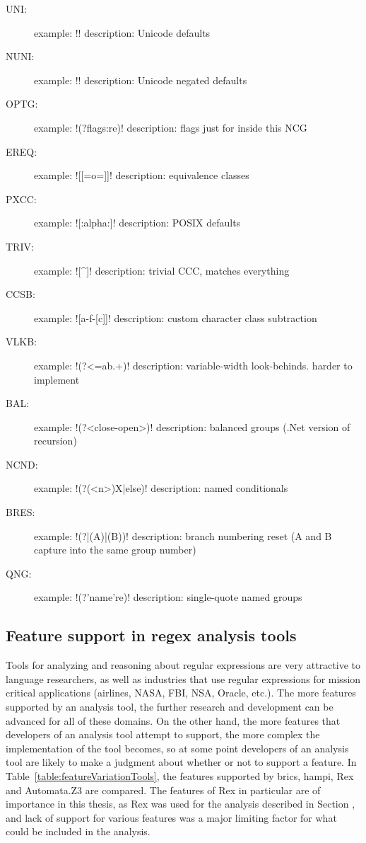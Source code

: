 \begin{description}
\item[UNI:] example: \cverb!\pL! description: Unicode defaults
\item[NUNI:] example: \cverb!\PS! description: Unicode negated defaults
\item[OPTG:] example: \cverb!(?flags:re)! description: flags just for inside this NCG
\item[EREQ:] example: \cverb![[=o=]]! description: equivalence classes
\item[PXCC:] example: \cverb![:alpha:]! description: POSIX defaults
\item[TRIV:] example: \cverb![^]! description: trivial CCC, matches everything
\item[CCSB:] example: \cverb![a-f-[c]]! description: custom character class subtraction
\item[VLKB:] example: \cverb!(?<=ab.+)! description: variable-width look-behinds.  harder to implement
\item[BAL:] example: \cverb!(?<close-open>)! description:  balanced groups (.Net version of recursion)
\item[NCND:] example: \cverb!(?(<n>)X|else)! description: named conditionals
\item[BRES:] example: \cverb!(?|(A)|(B))! description: branch numbering reset (A and B capture into the same group number)
\item[QNG:] example: \cverb!(?'name're)! description: single-quote named groups
\end{description}



\subsection{Feature support in regex analysis tools}
Tools for analyzing and reasoning about regular expressions are very attractive to language researchers, as well as industries that use regular expressions for mission critical applications (airlines, NASA, FBI, NSA, Oracle, etc.).  The more features supported by an analysis tool, the further research and development can be advanced for all of these domains.  On the other hand, the more features that developers of an analysis tool attempt to support, the more complex the implementation of the tool becomes, so at some point developers of an analysis tool are likely to make a judgment about whether or not to support a feature.  In Table~\ref{table:featureVariationTools}, the features supported by brics, hampi, Rex and Automata.Z3 are compared.  The features of Rex in particular are of importance in this thesis, as Rex was used for the analysis described in Section , and lack of support for various features was a major limiting factor for what could be included in the analysis.

